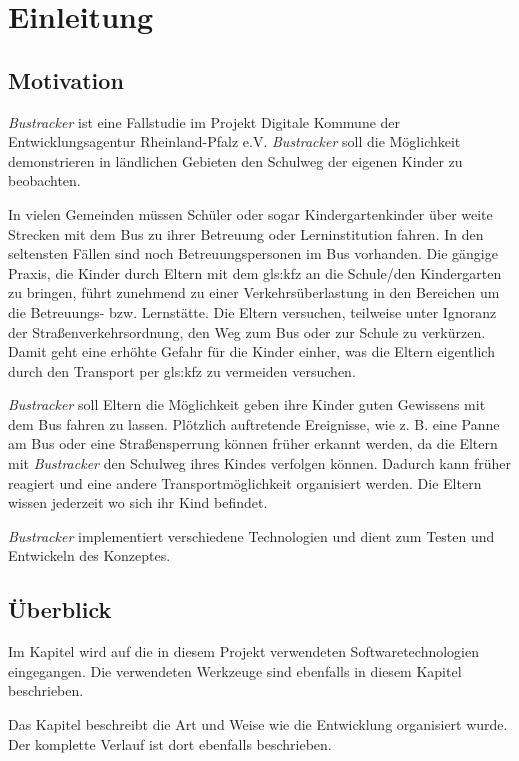 \chapter{Einleitung}
\label{Einleitung}

\section{Motivation}
\emph{Bustracker} ist eine Fallstudie im Projekt \glqq Digitale Kommune\grqq{} der Entwicklungsagentur Rheinland-Pfalz e.V. \emph{Bustracker} soll die Möglichkeit demonstrieren in ländlichen Gebieten den Schulweg der eigenen Kinder zu beobachten. 

In vielen Gemeinden müssen Schüler oder sogar Kindergartenkinder über weite Strecken mit dem Bus zu ihrer Betreuung oder Lerninstitution fahren. In den seltensten Fällen sind noch Betreuungspersonen im Bus vorhanden. Die gängige Praxis, die Kinder durch Eltern mit dem \gls{gls:kfz} an die Schule/den Kindergarten zu bringen, führt zunehmend zu einer Verkehrsüberlastung in den Bereichen um die Betreuungs- bzw. Lernstätte. Die Eltern versuchen, teilweise unter Ignoranz der Straßenverkehrsordnung, den Weg zum Bus oder zur Schule zu verkürzen. 
Damit geht eine erhöhte Gefahr für die Kinder einher, was die Eltern eigentlich durch den Transport per \gls{gls:kfz} zu vermeiden versuchen. 

\emph{Bustracker} soll Eltern die Möglichkeit geben ihre Kinder guten Gewissens mit dem Bus fahren zu lassen.
Plötzlich auftretende Ereignisse, wie z. B. eine Panne am Bus oder eine Straßensperrung können früher erkannt werden, da die Eltern mit \emph{Bustracker} den Schulweg ihres Kindes verfolgen können. Dadurch kann früher reagiert und eine andere Transportmöglichkeit organisiert werden. Die Eltern wissen jederzeit wo sich ihr Kind befindet.  

\emph{Bustracker} implementiert verschiedene Technologien und dient zum Testen und Entwickeln des Konzeptes.


\section{Überblick}
Im Kapitel \textbf{} wird auf die in diesem Projekt verwendeten Softwaretechnologien eingegangen. Die verwendeten Werkzeuge sind ebenfalls in diesem Kapitel beschrieben.

Das Kapitel \textbf{} beschreibt die Art und Weise wie die Entwicklung organisiert wurde. Der komplette Verlauf ist dort ebenfalls beschrieben.

